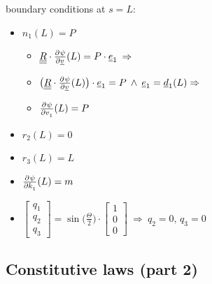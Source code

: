 \begin{frame}
\begin{multicols}{2}
    boundary conditions at $s=L$:
    \begin{itemize}
      \item $n_1(L) = P$
        \begin{itemize}
          \item $\doubleunderline{R} \cdot \pd{\psi}{\underline{v}}(L) = P \cdot \underline{e}_1 \: \Rightarrow$
          \item $\bigl( \doubleunderline{R} \cdot \pd{\psi}{\underline{v}}(L) \bigr) \cdot \underline{e}_1 = P \: \wedge \: \underline{e}_1 = \underline{d}_1(L) \Rightarrow$
          \item $\pd{\psi}{v_1}(L) = P$
        \end{itemize}
      \item $r_2(L) = 0$
      \item $r_3(L) = L$
      \item $\pd{\psi}{k_1}(L) = m$
      \item $\begin{bmatrix}
              q_1 \\ q_2 \\ q_3
            \end{bmatrix} =
            \sin \bigl( \frac{\Theta}{2} \bigr) \cdot
            \begin{bmatrix}
              1 \\ 0 \\ 0
            \end{bmatrix}
            \: \Rightarrow \: q_2 =0 , \, q_3 = 0$
    \end{itemize}
  \end{multicols}
\end{frame}


\subsection{Constitutive laws (part 2)}

